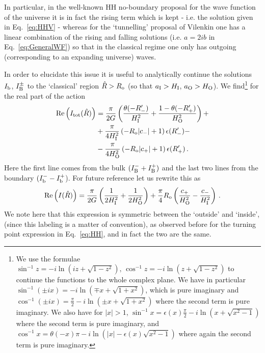 \documentclass[11pt,a4paper]{article}
\begin{document}
In particular, in the well-known HH no-boundary proposal for the wave function of the universe it is in fact the rising term which is kept - i.e. the solution given in Eq.~\eqref{eq:HHV} - whereas for the `tunnelling' proposal of Vilenkin one has a linear combination of the rising and falling solutions (i.e. $a = 2ib$ in Eq.~\eqref{eq:GeneralWF}) so that in the classical regime one only has outgoing (corresponding to an expanding universe) waves.

In order to elucidate this issue it is useful to analytically continue
the solutions $I_{\rm b}$, $I_{\rm B}^{\pm}$ to the `classical' region $\hat{R} > R_{\rm o}$ (so that $a_{\rm I} > H_{\rm I}$, $a_{\rm O} > H_{\rm O}$). We find\footnote{We use the formulae $\sin^{-1}z=-i\ln\left(iz+\sqrt{1-z^{2}}\right),\,\cos^{-1}z=-i\ln\left(z+\sqrt{1-z^{2}}\right)$ to continue the functions to the whole complex plane. We have in particular $\sin^{-1}\left(\pm ix\right)=-i\ln(\mp x+\sqrt{1+x^{2}})$, which is pure imaginary and $\cos^{-1}\left(\pm ix\right)=\frac{\pi}{2}-i\ln(\pm x+\sqrt{1+x^{2}})$ where the second term is pure imaginary. We also have for $|x|>1$, $\sin^{-1}x=\epsilon(x)\frac{\pi}{2}-i\ln\left(x+\sqrt{x^{2}-1}\right)$ where the second term is pure imaginary, and $\cos^{-1}x=\theta(-x)\pi-i\ln\left(|x|-\epsilon(x)\sqrt{x^{2}-1}\right)$ where again the second term is pure imaginary.} for the real part of the action
\begin{align}
\text{Re}\left(I_{\rm tot} (\hat{R}) \right) & = \frac{\pi}{2 G}\left(\frac{\theta(- R'_{-})}{H_{\rm I}^{2}} + \frac{1 - \theta(-R'_{+})}{H_{\rm O}^{2}}\right) + \nonumber \\
 & +\frac{\pi}{4H_{\rm I}^{2}} \left(-R_{\rm o}| c_{-}| + 1\right)\epsilon(R'_{-}) - \label{eq:realIRhat} \\
 & -\frac{\pi}{4H_{\rm O}^{2}} \left(-R_{\rm o}| c_{+}| + 1\right)\epsilon(R'_{+}) \nonumber \,.
\end{align}
Here the first line comes from the bulk $(I_{\rm B}^{-} + I_{\rm B}^{+})$ and the last two lines from the boundary $(I_{\rm b}^{-} - I_{\rm b}^{+}$). For future reference let us rewrite this as
\begin{equation}
\text{Re}\left(I(\hat{R})\right) = \frac{\pi}{2G}\left(\frac{1}{2H_{\rm I}^{2}} + \frac{1}{2H_{\rm O}^{2}}\right) + \frac{\pi}{4}R_{\rm o}\left(\frac{c_{+}}{H_{\rm O}^{2}} - \frac{c_{-}}{H_{\rm I}^{2}}\right) \,.\label{eq:realIRhat2}
\end{equation}
We note here that this expression is symmetric between the `outside' and `inside', (since this labeling is a matter of convention), as observed before for the turning point expression in Eq.~\eqref{eq:HH}, and in fact the two are the same. 
\end{document}
